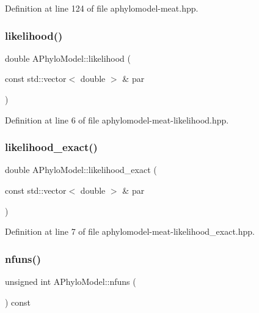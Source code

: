 Definition at line 124 of file aphylomodel-\/meat.\+hpp.

\mbox{\label{class_a_phylo_model_a66fced3b89fe385862318621855fa605}} 
\subsubsection{\texorpdfstring{likelihood()}{likelihood()}}
{\footnotesize\ttfamily double A\+Phylo\+Model\+::likelihood (\begin{DoxyParamCaption}\item[{const std\+::vector$<$ double $>$ \&}]{par }\end{DoxyParamCaption})}



Definition at line 6 of file aphylomodel-\/meat-\/likelihood.\+hpp.

\mbox{\label{class_a_phylo_model_a22e8844816076c6f13d0371b1b62a22a}} 
\subsubsection{\texorpdfstring{likelihood\+\_\+exact()}{likelihood\_exact()}}
{\footnotesize\ttfamily double A\+Phylo\+Model\+::likelihood\+\_\+exact (\begin{DoxyParamCaption}\item[{const std\+::vector$<$ double $>$ \&}]{par }\end{DoxyParamCaption})}



Definition at line 7 of file aphylomodel-\/meat-\/likelihood\+\_\+exact.\+hpp.

\mbox{\label{class_a_phylo_model_ad50c485128331dcfc3e24ef3765d36ef}} 
\subsubsection{\texorpdfstring{nfuns()}{nfuns()}}
{\footnotesize\ttfamily unsigned int A\+Phylo\+Model\+::nfuns (\begin{DoxyParamCaption}{ }\end{DoxyParamCaption}) const\hspace{0.3cm}{\ttfamily [inline]}}



